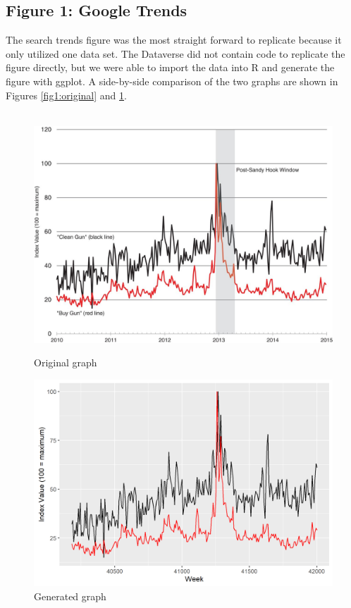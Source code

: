 \documentclass[12pt]{article}%
\begin{document}
\subsection*{Figure 1: Google Trends}
The search trends figure was the most straight forward to replicate because it only utilized one data set. The Dataverse did not contain code to replicate the figure directly, but we were able to import the data into R and generate the figure with ggplot. A side-by-side comparison of the two graphs are shown in Figures \ref{fig1:original} and \ref{fig:fig1_generated}. \\ \\
\begin{figure}[htbb]
	\begin{minipage}[b]{0.5\linewidth}
		\centering
		\includegraphics[width=\linewidth]{figures/fig1_original.jpg}
		\caption{Original graph}
		\label{fig:fig1_original}
	\end{minipage}
	\hspace{0.5cm}
	\begin{minipage}[b]{0.5\linewidth}
		\centering
		\includegraphics[width=\linewidth]{figures/fig1_generated.png}
		\caption{Generated graph}
		\label{fig:fig1_generated}
	\end{minipage}
\end{figure}
\end{document}
